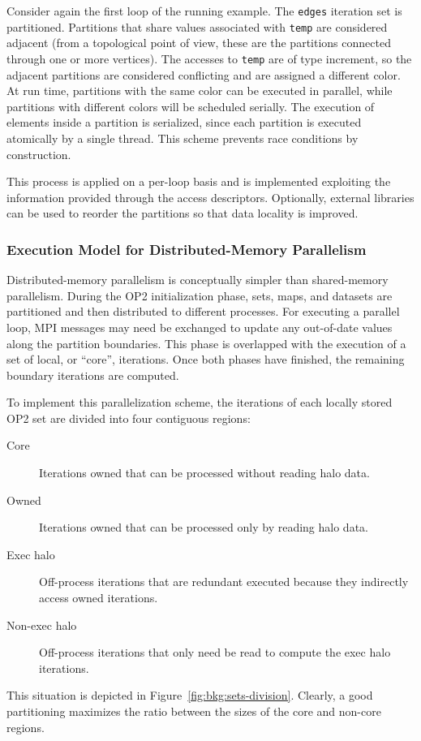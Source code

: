 Consider again the first loop of the running example. The {\tt edges} iteration set is partitioned. Partitions that share values associated with {\tt temp} are considered adjacent (from a topological point of view, these are the partitions connected through one or more vertices). The accesses to {\tt temp} are of type increment, so the adjacent partitions are considered conflicting and are assigned a different color. At run time, partitions with the same color can be executed in parallel, while partitions with different colors will be scheduled serially. The execution of elements inside a partition is serialized, since each partition is executed atomically by a single thread. This scheme prevents race conditions by construction. 

This process is applied on a per-loop basis and is implemented exploiting the information provided through the access descriptors. Optionally, external libraries can be used to reorder the partitions so that data locality is improved. 

\subsubsection{Execution Model for Distributed-Memory Parallelism}
Distributed-memory parallelism is conceptually simpler than shared-memory parallelism. During the OP2 initialization phase, sets, maps, and datasets are partitioned and then distributed to different processes. For executing a parallel loop, MPI messages may need be exchanged to update any out-of-date values along the partition boundaries. This phase is overlapped with the execution of a set of local, or ``core'', iterations. Once both phases have finished, the remaining boundary iterations are computed.

To implement this parallelization scheme, the iterations of each locally stored OP2 set are divided into four contiguous regions:
\begin{description}
\item[Core] Iterations owned that can be processed without reading halo data. 
\item[Owned] Iterations owned that can be processed only by reading halo data.
\item[Exec halo] Off-process iterations that are redundant executed because they indirectly access owned iterations.
\item[Non-exec halo] Off-process iterations that only need be read to compute the exec halo iterations.
\end{description}
This situation is depicted in Figure~\ref{fig:bkg:sets-division}. Clearly, a good partitioning maximizes the ratio between the sizes of the core and non-core regions. 


